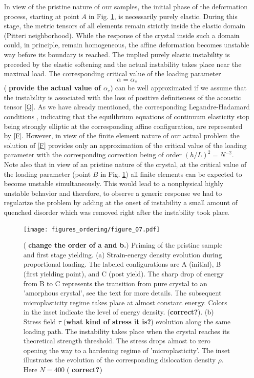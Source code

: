 \documentclass[aps,
superscriptaddress,notitlepage]{revtex4-1}
\begin{document}
In view of the pristine nature of our samples,  the initial phase of the deformation process,  starting at point $A$ in Fig. \ref{fig:02},   is necessarily  purely  elastic. During this stage, the  metric tensors  of all elements  remain  strictly  inside the elastic domain (Pitteri neighborhood). While the response of the crystal inside such a  domain could, in principle,  remain  homogeneous, the aﬃne deformation becomes   unstable way before its boundary is reached.  The implied purely elastic instability   is preceded by the   elastic softening  and the actual instability  takes place near the maximal load. The  corresponding critical value of the loading parameter $$\alpha=\alpha_c$$   (\textbf{ provide  the actual value of $\alpha_c$})  can be well approximated  if we assume that the instability is associated with the loss of  positive definiteness of  the acoustic tensor \eqref{Q}. As we have already mentioned, the corresponding Legandre-Hadamard  conditions \cite{Simpson1989,Grabovsky2013,Steigmann2023}, indicating that the equilibrium equations of continuum elasticity stop being strongly  elliptic   at the corresponding affine configuration, are represented by \eqref{F}.  However, in view of the finite element nature  of our actual problem the solution of  \eqref{F}  provides only an approximation of  the critical value of the loading parameter with  the corresponding correction being of order  $(h/L)^2=N^{-2}$.  Note also that in  view of an pristine   nature of the crystal, at the critical value of the loading parameter (point $B$ in Fig. \ref{fig:02}) all finite elements can be expected to  become unstable  simultaneously. This would lead  to a nonphysical highly unstable behavior    and therefore, to observe a generic response we had to regularize the problem by  adding  at the   onset of instability  a small amount of quenched  disorder which  was removed right after the instability  took place.


  
\begin{figure}[ht!]
\centering
\texttt{[image: figures\_ordering/figure\_07.pdf]}
\caption{ ( \textbf{change the order of a and b.}) Priming of the pristine sample  and first stage yielding.  (a) Strain-energy density evolution during proportional loading. The  labeled configurations are A (initial), B (first yielding point), and C (post yield). The sharp drop of energy from B to C represents the transition from pure crystal to an 'amorphous crystal', see the text for more details. The subsequent microplasticity regime takes place at almost constant energy. Colors in the inset indicate the level of energy density. (\textbf{correct?}). (b) Stress field $\tau$ (\textbf{what kind of stress it is?}) evolution along the same loading path. The instability takes place when the crystal reaches its  theoretical  strength threshold. The stress drops almost to zero opening the way to a hardening regime of 'microplasticity'.    The inset   illustrates the evolution of the corresponding dislocation density $\rho$. Here $N=400$ (\textbf{ correct?}) }  
\label{fig:02}
\end{figure}
\end{document}
